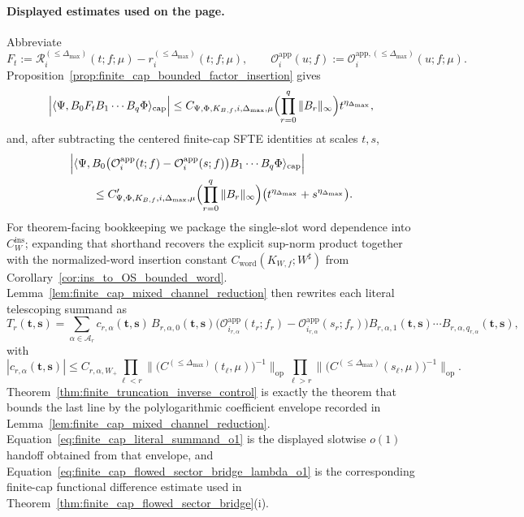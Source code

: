 \paragraph{Displayed estimates used on the page.}
Abbreviate
\[
F_t:=\mathcal R_i^{(\le \Delta_{\max})}(t;f;\mu)-r_i^{(\le \Delta_{\max})}(t;f;\mu),
\qquad
\mathcal O_i^{\mathrm{app}}(u;f):=\mathcal O_i^{\mathrm{app},(\le \Delta_{\max})}(u;f;\mu).
\]
Proposition~\ref{prop:finite_cap_bounded_factor_insertion} gives
\[
\Big|
\langle \Psi,B_0F_tB_1\cdots B_q\Phi\rangle_{\mathrm{cap}}
\Big|
\le
C_{\Psi,\Phi,K_{B,f},i,\Delta_{\max},\mu}
\Bigl(\prod_{r=0}^q\|B_r\|_\infty\Bigr)t^{\eta_{\Delta_{\max}}},
\]
and, after subtracting the centered finite-cap SFTE identities at scales \(t,s\),
\[
\begin{aligned}
&\Big|
\langle \Psi,
B_0\bigl(\mathcal O_i^{\mathrm{app}}(t;f)-\mathcal O_i^{\mathrm{app}}(s;f)\bigr)
B_1\cdots B_q\Phi
\rangle_{\mathrm{cap}}
\Big|\\
&\qquad\le
C'_{\Psi,\Phi,K_{B,f},i,\Delta_{\max},\mu}
\Bigl(\prod_{r=0}^q\|B_r\|_\infty\Bigr)
\bigl(t^{\eta_{\Delta_{\max}}}+s^{\eta_{\Delta_{\max}}}\bigr).
\end{aligned}
\]
For theorem-facing bookkeeping we package the single-slot word dependence into $C_W^{\mathrm{ins}}$; expanding that shorthand recovers the explicit sup-norm product together with the normalized-word insertion constant $C_{\mathrm{word}}(K_{W,f};W^{\sharp})$ from Corollary~\ref{cor:ins_to_OS_bounded_word}.
Lemma~\ref{lem:finite_cap_mixed_channel_reduction} then rewrites each literal telescoping summand as
\[
T_r(\mathbf t,\mathbf s)
=
\sum_{\alpha\in\mathcal A_r}
 c_{r,\alpha}(\mathbf t,\mathbf s)\,
B_{r,\alpha,0}(\mathbf t,\mathbf s)
\bigl(
\mathcal O_{i_{r,\alpha}}^{\mathrm{app}}(t_r;f_r)
-
\mathcal O_{i_{r,\alpha}}^{\mathrm{app}}(s_r;f_r)
\bigr)
B_{r,\alpha,1}(\mathbf t,\mathbf s)\cdots B_{r,\alpha,q_{r,\alpha}}(\mathbf t,\mathbf s),
\]
with
\[
|c_{r,\alpha}(\mathbf t,\mathbf s)|
\le
C_{r,\alpha,W_+}
\prod_{\ell<r}\big\|\big(C^{(\le \Delta_{\max})}(t_\ell,\mu)\big)^{-1}\big\|_{\mathrm{op}}
\prod_{\ell>r}\big\|\big(C^{(\le \Delta_{\max})}(s_\ell,\mu)\big)^{-1}\big\|_{\mathrm{op}}.
\]
Theorem~\ref{thm:finite_truncation_inverse_control} is exactly the theorem that bounds the last line by the polylogarithmic coefficient envelope recorded in Lemma~\ref{lem:finite_cap_mixed_channel_reduction}.
Equation~\eqref{eq:finite_cap_literal_summand_o1} is the displayed slotwise $o(1)$ handoff obtained from that envelope, and Equation~\eqref{eq:finite_cap_flowed_sector_bridge_lambda_o1} is the corresponding finite-cap functional difference estimate used in Theorem~\ref{thm:finite_cap_flowed_sector_bridge}(i).

